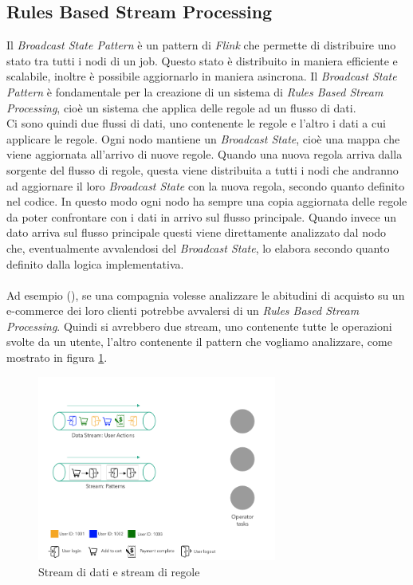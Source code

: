 \subsection{Rules Based Stream Processing}
\label{subsec:RulesBasedStreamProcessing}
Il \textit{Broadcast State Pattern} è un pattern di \textit{Flink} che permette di distribuire uno stato tra tutti i nodi di un job.
Questo stato è distribuito in maniera efficiente e scalabile, inoltre è possibile aggiornarlo in maniera asincrona.
Il \textit{Broadcast State Pattern} è fondamentale per la creazione di un sistema di \textit{Rules Based Stream Processing}, 
cioè un sistema che applica delle regole ad un flusso di dati.\\
Ci sono quindi due flussi di dati, uno contenente le regole e l'altro i dati a cui applicare le regole.
Ogni nodo mantiene un \textit{Broadcast State}, cioè una mappa che viene aggiornata all'arrivo di nuove regole.
Quando una nuova regola arriva dalla sorgente del flusso di regole, questa viene distribuita a tutti i nodi che andranno ad aggiornare il loro \textit{Broadcast State}
con la nuova regola, secondo quanto definito nel codice. In questo modo ogni nodo ha sempre una copia aggiornata delle regole da poter confrontare con i dati in arrivo sul flusso principale.
Quando invece un dato arriva sul flusso principale questi viene direttamente analizzato dal nodo che, eventualmente avvalendosi del \textit{Broadcast State}, lo elabora 
secondo quanto definito dalla logica implementativa.\\\\
Ad esempio (), se una compagnia volesse analizzare le abitudini di acquisto su un e-commerce dei loro clienti 
potrebbe avvalersi di un \textit{Rules Based Stream Processing}. Quindi si avrebbero due stream, uno contenente tutte le operazioni svolte da un utente,
l'altro contenente il pattern che vogliamo analizzare, come mostrato in figura \ref{fig:broadcastState1}.
\begin{figure}[htpb]
    \centering
    \includegraphics[width=0.7\textwidth]{images/EventExport/broadcastState1.png}
    \caption{Stream di dati e stream di regole}
    \label{fig:broadcastState1}
\end{figure}
